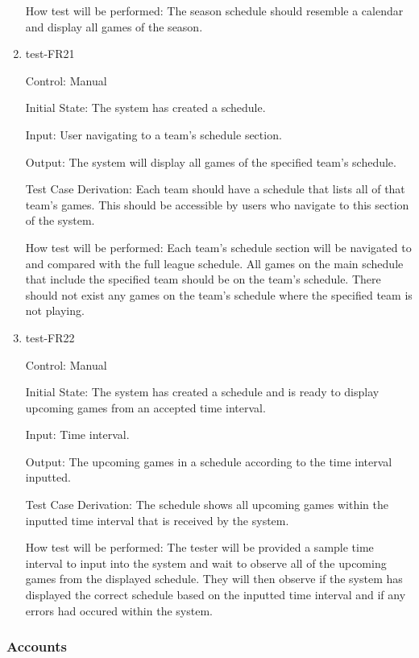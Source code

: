 \documentclass[12pt, titlepage]{article}
\begin{document}
\begin{enumerate}
  How test will be performed: The season schedule should resemble a calendar and display all games of the season.

  \item{test-FR21\\}

  Control: Manual

  Initial State: The system has created a schedule.

  Input: User navigating to a team's schedule section.

  Output: The system will display all games of the specified team's schedule.

  Test Case Derivation: Each team should have a schedule that lists all of
  that team's games. This should be accessible by users who navigate to this
  section of the system.

  How test will be performed: Each team's schedule section will be navigated to
  and compared with the full league schedule. All games on the main schedule
  that include the specified team should be on the team's schedule. There should
  not exist any games on the team's schedule where the specified team is not
  playing.

  \item{test-FR22\\}

  Control: Manual

  Initial State: The system has created a schedule and is ready to display upcoming games from
  an accepted time interval.

  Input: Time interval.

  Output: The upcoming games in a schedule according to the time interval inputted.

  Test Case Derivation: The schedule shows all upcoming games within the inputted time interval
  that is received by the system.

  How test will be performed: The tester will be provided a sample time interval to input
  into the system and wait to observe all of the upcoming games from the displayed schedule.
  They will then observe if the system has displayed the correct schedule based on the
  inputted time interval and if any errors had occured within the system. 

\end{enumerate}

\subsubsection{Accounts}
\end{document}
